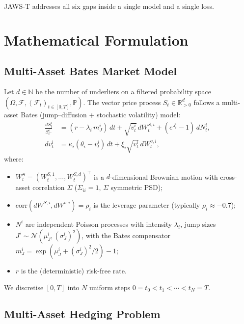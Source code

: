 \documentclass[11pt,a4paper]{article}
\begin{document}
JAWS-T addresses all six gaps inside a single model and a single loss.

\section{Mathematical Formulation}

\subsection{Multi-Asset Bates Market Model}

Let $d \in \mathbb{N}$ be the number of underliers on a filtered probability
space $(\Omega, \mathcal{F}, (\mathcal{F}_t)_{t\in[0,T]}, \mathbb{P})$. The
vector price process $S_t \in \mathbb{R}^d_{>0}$ follows a multi-asset Bates
(jump--diffusion + stochastic volatility) model:
\begin{align}
\frac{dS_t^i}{S_{t^-}^i} &= (r - \lambda_i\, m^i_J)\,dt + \sqrt{v_t^i}\, dW_t^{S,i}
  + (e^{J_t^i} - 1)\, dN_t^i,\\
dv_t^i &= \kappa_i(\theta_i - v_t^i)\,dt + \xi_i\sqrt{v_t^i}\, dW_t^{v,i},
\end{align}
where:
\begin{itemize}
  \item $W_t^S = (W_t^{S,1},\dots,W_t^{S,d})^\top$ is a $d$-dimensional Brownian
    motion with cross-asset correlation $\Sigma$ ($\Sigma_{ii}=1$, $\Sigma$
    symmetric PSD);
  \item $\mathrm{corr}(dW^{S,i}, dW^{v,i}) = \rho_i$ is the leverage
    parameter (typically $\rho_i \approx -0.7$);
  \item $N^i$ are independent Poisson processes with intensity $\lambda_i$,
    jump sizes $J^i \sim \mathcal{N}(\mu_J^i, (\sigma_J^i)^2)$, with the Bates
    compensator $m_J^i = \exp(\mu_J^i + (\sigma_J^i)^2/2) - 1$;
  \item $r$ is the (deterministic) risk-free rate.
\end{itemize}
We discretise $[0,T]$ into $N$ uniform steps $0 = t_0 < t_1 < \cdots < t_N = T$.

\subsection{Multi-Asset Hedging Problem}
\end{document}
